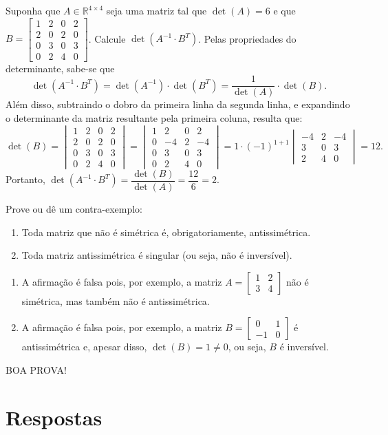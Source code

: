 \documentclass[12pt,a4paper]{article}
\newcommand*\R{\mathbb{R}}
\begin{document}
\begin{ExerciseList}
\Exercise[title={2,0}] Suponha que $A \in \R^{4 \times 4}$ seja uma matriz tal que $\det(A) = 6$ e que $B =
\begin{bmatrix}
1 & 2 & 0 & 2\\
2 & 0 & 2 & 0\\
0 & 3 & 0 & 3\\
0 & 2 & 4 & 0
\end{bmatrix}$. Calcule $\det(A^{-1} \cdot B^T)$.
\Answer Pelas propriedades do determinante, sabe-se que
\[
\det(A^{-1} \cdot B^T)
=\det(A^{-1}) \cdot \det(B^T)
=\frac{1}{\det(A)} \cdot \det(B).
\]
Além disso, subtraindo o dobro da primeira linha da segunda linha, e expandindo o determinante da matriz resultante pela primeira coluna, resulta que:
\[
\det(B) =
\begin{vmatrix}
1 & 2 & 0 & 2\\
2 & 0 & 2 & 0\\
0 & 3 & 0 & 3\\
0 & 2 & 4 & 0
\end{vmatrix}
=
\begin{vmatrix}
1 & 2 & 0 & 2\\
0 & -4 & 2 & -4\\
0 & 3 & 0 & 3\\
0 & 2 & 4 & 0
\end{vmatrix}
=
1 \cdot (-1)^{1+1}
\begin{vmatrix}
-4 & 2 & -4\\
3 & 0 & 3\\
2 & 4 & 0
\end{vmatrix}
=12.
\]
Portanto, $\det(A^{-1} \cdot B^T)
=\dfrac{\det(B)}{\det(A)}
=\dfrac{12}{6}
=2$.


\Exercise[title={2,0}] Prove ou dê um contra-exemplo:
\begin{enumerate}
\item Toda matriz que não é simétrica é, obrigatoriamente, antissimétrica.
\item Toda matriz antissimétrica é singular (ou seja, não é inversível).
\end{enumerate}
\Answer
\begin{enumerate}
\item A afirmação é falsa pois, por exemplo, a matriz
$A =
\begin{bmatrix}
1 & 2 \\ 3 & 4
\end{bmatrix}$
não é simétrica, mas também não é antissimétrica.

\item A afirmação é falsa pois, por exemplo, a matriz
$B =
\begin{bmatrix}
0 & 1 \\ -1 & 0
\end{bmatrix}$
é antissimétrica e, apesar disso, $\det(B) = 1 \neq 0$, ou seja, $B$ é inversível.

\end{enumerate}
\end{ExerciseList}

\vfill
\begin{center}
BOA PROVA!
\end{center}

\newpage
\restoregeometry
\section*{Respostas}
\shipoutAnswer
\end{document}
